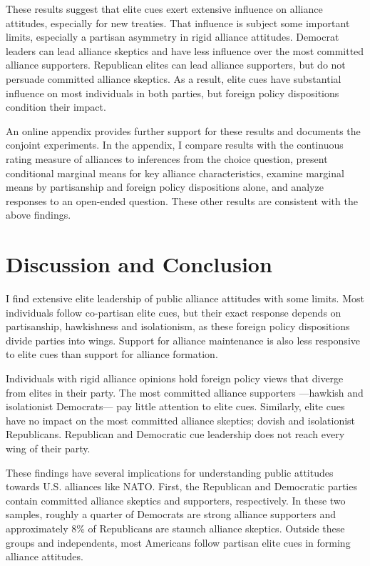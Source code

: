 \documentclass[12pt]{article}
\begin{document}
These results suggest that elite cues exert extensive influence on alliance attitudes, especially for new treaties.
That influence is subject some important limits, especially a partisan asymmetry in rigid alliance attitudes. 
Democrat leaders can lead alliance skeptics and have less influence over the most committed alliance supporters. 
Republican elites can lead alliance supporters, but do not persuade committed alliance skeptics. 
As a result, elite cues have substantial influence on most individuals in both parties, but foreign policy dispositions condition their impact. 


An online appendix provides further support for these results and documents the conjoint experiments. 
In the appendix, I compare results with the continuous rating measure of alliances to inferences from the choice question, present conditional marginal means for key alliance characteristics, examine marginal means by partisanship and foreign policy dispositions alone, and analyze responses to an open-ended question. 
These other results are consistent with the above findings. 


\section{Discussion and Conclusion} 


I find extensive elite leadership of public alliance attitudes with some limits.  
Most individuals follow co-partisan elite cues, but their exact response depends on partisanship, hawkishness and isolationism, as these foreign policy dispositions divide parties into wings.
Support for alliance maintenance is also less responsive to elite cues than support for alliance formation. 


Individuals with rigid alliance opinions hold foreign policy views that diverge from elites in their party.  
The most committed alliance supporters ---hawkish and isolationist Democrats--- pay little attention to elite cues.
Similarly, elite cues have no impact on the most committed alliance skeptics; dovish and isolationist Republicans. 
Republican and Democratic cue leadership does not reach every wing of their party. 


These findings have several implications for understanding public attitudes towards U.S. alliances like NATO. 
First, the Republican and Democratic parties contain committed alliance skeptics and supporters, respectively.
In these two samples, roughly a quarter of Democrats are strong alliance supporters and approximately 8\% of Republicans are staunch alliance skeptics.
Outside these groups and independents, most Americans follow partisan elite cues in forming alliance attitudes. 
\end{document}
